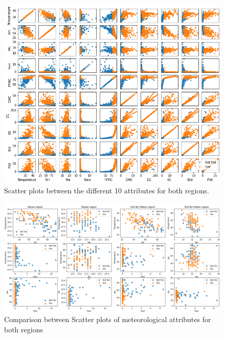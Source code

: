 \documentclass[10pt]{article}
\numberwithin{equation}{section}
\numberwithin{figure}{section}
\numberwithin{table}{section}
\begin{document}
\begin{figure} [H]
    \centering
    \includegraphics[scale=0.5]{Figures/DataVisualization.png}
    \caption{Scatter plots between the different 10 attributes for both regions.}
    \label{fig:DataVisialization}
\end{figure} 

\begin{figure}[H]
    \centering
    \includegraphics[width=\textwidth,height=\textheight,keepaspectratio]{Figures/compare_meteo_data.png}
    \caption{Comparison between Scatter plots of meteorological attributes for both regions}
    \label{fig:scatter_comparison}
\end{figure}
\end{document}
